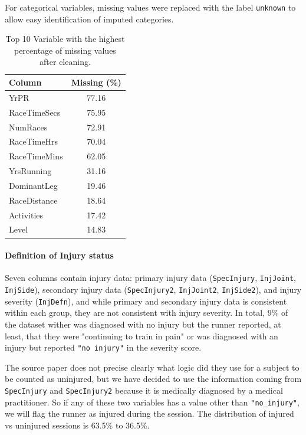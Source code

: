 For categorical variables, missing values were replaced with the label \texttt{unknown} to allow easy identification of imputed categories.

\begin{table}[htbp]
    \centering
    \caption[Top 10 metadata variable with most missing values]{Top 10 Variable with the highest percentage of missing values after cleaning.\label{tab:met-missing-values}}
    \begin{tabular}{lc}
        \hline
        \textbf{Column} & \textbf{Missing (\%)} \\
        \hline
        YrPR & 77.16 \\
        RaceTimeSecs & 75.95 \\
        NumRaces & 72.91 \\
        RaceTimeHrs & 70.04 \\
        RaceTimeMins & 62.05 \\
        YrsRunning & 31.16 \\
        DominantLeg & 19.46 \\
        RaceDistance & 18.64 \\
        Activities & 17.42 \\
        Level & 14.83 \\
        \hline
    \end{tabular}
\end{table}


\paragraph{Definition of Injury status}
Seven columns contain injury data: primary injury data (\texttt{SpecInjury}, \texttt{InjJoint}, \texttt{InjSide}), secondary injury data (\texttt{SpecInjury2}, \texttt{InjJoint2}, \texttt{InjSide2}), and injury severity (\texttt{InjDefn}), and while primary and secondary injury data is consistent within each group, they are not consistent with injury severity. In total, 9\% of the dataset wither was diagnosed with no injury but the runner reported, at least, that they were "continuing to train in pain" or was diagnosed with an injury but reported \texttt{"no injury"} in the severity score.

The source paper does not precise clearly what logic did they use for a subject to be counted as uninjured, but we have decided to use the information coming from \texttt{SpecInjury} and \texttt{SpecInjury2} because it is medically diagnosed by a medical practitioner. So if any of these two variables has a value other than \texttt{"no\_injury"}, we will flag the runner as injured during the session. The distribution of injured vs uninjured sessions is 63.5\% to 36.5\%.


